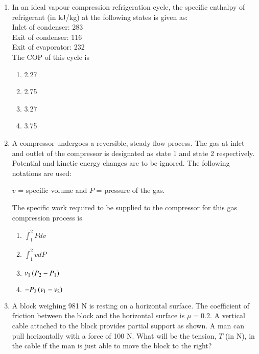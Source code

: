 \documentclass[journal]{IEEEtran}
\begin{document}
\begin{enumerate}
    \item In an ideal vapour compression refrigeration cycle, the specific
    enthalpy of refrigerant (in kJ/kg) at the following states is given as: \\
    Inlet of condenser: 283 \\
    Exit of condenser: 116 \\
    Exit of evaporator: 232 \\
    The COP of this cycle is
    \begin{multicols}{4}
    \begin{enumerate}
        \item 2.27
        \item 2.75
        \item 3.27
        \item 3.75
    \end{enumerate}
    \end{multicols}

    \item A compressor undergoes a reversible, steady flow process. The gas
    at inlet and outlet of the compressor is designated as state 1 and state
    2 respectively. Potential and kinetic energy changes are to be ignored.
    The following notations are used:
    
    $v$ = specific volume and $P$ = pressure of the gas.
    
    The specific work required to be supplied to the compressor for this gas
    compression process is 
    \begin{multicols}{4}
    \begin{enumerate}
    \item $\int_{1}^{2} Pdv$
    \item $\int_{1}^{2} vdP$
    \item $v_1\left(P_2 - P_1\right)$
    \item $-P_2\left(v_1 - v_2\right)$
    \end{enumerate}
    \end{multicols}

    \item A block weighing 981 N is resting on a horizontal surface. The coefficient
    of friction between the block and the horizontal surface is $\mu = 0.2$. A vertical
    cable attached to the block provides partial support as shown. A man can pull
    horizontally with a force of 100 N. What will be the tension, $T$ (in N), in the
    cable if the man is just able to move the block to the right?
    

\end{enumerate}
\end{document}
